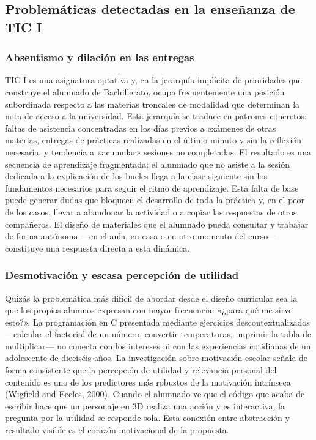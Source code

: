 \documentclass[a4paper,12pt]{article}
\begin{document}
\subsection{Problemáticas detectadas en la enseñanza de TIC I}

\subsubsection*{Absentismo y dilación en las entregas}

TIC I es una asignatura optativa y, en la jerarquía implícita de prioridades que construye el alumnado de Bachillerato, ocupa frecuentemente una posición subordinada respecto a las materias troncales de modalidad que determinan la nota de acceso a la universidad. Esta jerarquía se traduce en patrones concretos: faltas de asistencia concentradas en los días previos a exámenes de otras materias, entregas de prácticas realizadas en el último minuto y sin la reflexión necesaria, y tendencia a «acumular» sesiones no completadas. El resultado es una secuencia de aprendizaje fragmentada: el alumnado que no asiste a la sesión dedicada a la explicación de los bucles llega a la clase siguiente sin los fundamentos necesarios para seguir el ritmo de aprendizaje. Esta falta de base puede generar dudas que bloqueen el desarrollo de toda la práctica y, en el peor de los casos, llevar a abandonar la actividad o a copiar las respuestas de otros compañeros. El diseño de materiales que el alumnado pueda consultar y trabajar de forma autónoma ---en el aula, en casa o en otro momento del curso--- constituye una respuesta directa a esta dinámica.

\subsubsection*{Desmotivación y escasa percepción de utilidad}

Quizás la problemática más difícil de abordar desde el diseño curricular sea la que los propios alumnos expresan con mayor frecuencia: «¿para qué me sirve esto?». La programación en C presentada mediante ejercicios descontextualizados —calcular el factorial de un número, convertir temperaturas, imprimir la tabla de multiplicar— no conecta con los intereses ni con las experiencias cotidianas de un adolescente de dieciséis años. La investigación sobre motivación escolar señala de forma consistente que la percepción de utilidad y relevancia personal del contenido es uno de los predictores más robustos de la motivación intrínseca (Wigfield and Eccles, 2000). Cuando el alumnado ve que el código que acaba de escribir hace que un personaje en 3D realiza una acción y es interactiva, la pregunta por la utilidad se responde sola. Esta conexión entre abstracción y resultado visible es el corazón motivacional de la propuesta.
\end{document}
